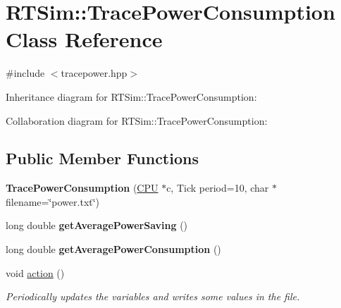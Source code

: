 \hypertarget{classRTSim_1_1TracePowerConsumption}{}\section{R\+T\+Sim\+:\+:Trace\+Power\+Consumption Class Reference}
\label{classRTSim_1_1TracePowerConsumption}


{\ttfamily \#include $<$tracepower.\+hpp$>$}



Inheritance diagram for R\+T\+Sim\+:\+:Trace\+Power\+Consumption\+:


Collaboration diagram for R\+T\+Sim\+:\+:Trace\+Power\+Consumption\+:
\subsection*{Public Member Functions}
\begin{DoxyCompactItemize}
\item 
{\bfseries Trace\+Power\+Consumption} (\hyperlink{classRTSim_1_1CPU}{C\+PU} $\ast$c, Tick period=10, char $\ast$filename=\char`\"{}power.\+txt\char`\"{})\hypertarget{classRTSim_1_1TracePowerConsumption_a18e41d4bcb6e5862a0c19ea6f39d687b}{}\label{classRTSim_1_1TracePowerConsumption_a18e41d4bcb6e5862a0c19ea6f39d687b}

\item 
long double {\bfseries get\+Average\+Power\+Saving} ()\hypertarget{classRTSim_1_1TracePowerConsumption_ae7c9c54ecdcbc8581233a19d12b10d9c}{}\label{classRTSim_1_1TracePowerConsumption_ae7c9c54ecdcbc8581233a19d12b10d9c}

\item 
long double {\bfseries get\+Average\+Power\+Consumption} ()\hypertarget{classRTSim_1_1TracePowerConsumption_a8051ba7ae6e7c0d5f4d1c065cc2923f5}{}\label{classRTSim_1_1TracePowerConsumption_a8051ba7ae6e7c0d5f4d1c065cc2923f5}

\item 
void \hyperlink{classRTSim_1_1TracePowerConsumption_a22265a6249eb5b0521e6f6e6288ddeb5}{action} ()\hypertarget{classRTSim_1_1TracePowerConsumption_a22265a6249eb5b0521e6f6e6288ddeb5}{}\label{classRTSim_1_1TracePowerConsumption_a22265a6249eb5b0521e6f6e6288ddeb5}

\begin{DoxyCompactList}\small\item\em Periodically updates the variables and writes some values in the file. \end{DoxyCompactList}\end{DoxyCompactItemize}
